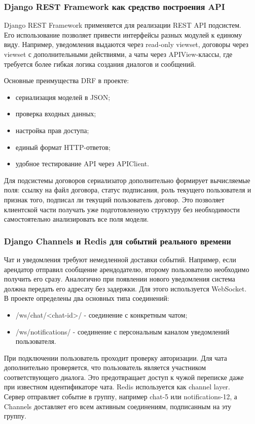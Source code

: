 \subsubsection{Django REST Framework как средство построения API}
Django REST Framework применяется для реализации REST API подсистем. Его использование позволяет привести интерфейсы разных модулей к единому виду. Например, уведомления выдаются через read-only viewset, договоры через viewset с дополнительными действиями, а чаты через APIView-классы, где требуется более гибкая логика создания диалогов и сообщений.

Основные преимущества DRF в проекте:
\begin{itemize}
\item сериализация моделей в JSON;
\item проверка входных данных;
\item настройка прав доступа;
\item единый формат HTTP-ответов;
\item удобное тестирование API через APIClient.
\end{itemize}

Для подсистемы договоров сериализатор дополнительно формирует вычисляемые поля: ссылку на файл договора, статус подписания, роль текущего пользователя и признак того, подписал ли текущий пользователь договор. Это позволяет клиентской части получать уже подготовленную структуру без необходимости самостоятельно анализировать все поля модели.

\subsubsection{Django Channels и Redis для событий реального времени}
Чат и уведомления требуют немедленной доставки событий. Например, если арендатор отправил сообщение арендодателю, второму пользователю необходимо получить его сразу. Аналогично при появлении нового уведомления система должна передать его адресату без задержки.
Для этого используется WebSocket. В проекте определены два основных типа соединений:
\begin{itemize}
\item /ws/chat/<chat-id>/ - соединение с конкретным чатом;
\item /ws/notifications/ - соединение с персональным каналом уведомлений пользователя.
\end{itemize}

При подключении пользователь проходит проверку авторизации. Для чата дополнительно проверяется, что пользователь является участником соответствующего диалога. Это предотвращает доступ к чужой переписке даже при известном идентификаторе чата.
Redis используется как channel layer. Сервер отправляет событие в группу, например chat-5 или notifications-12, а Channels доставляет его всем активным соединениям, подписанным на эту группу.

